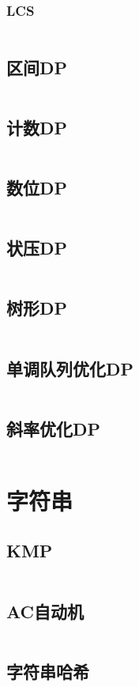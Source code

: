 \documentclass[a4paper,12pt]{article}
\begin{document}
\subsubsection{LCS}
\inputminted[breaklines, linenos]{c++}{dp/linear/lcs.cc}
\subsection{区间DP}
\inputminted[breaklines, linenos]{c++}{dp/interval.cc}
\subsection{计数DP}
\inputminted[breaklines, linenos]{c++}{dp/jishu.cc}
\subsection{数位DP}
\inputminted[breaklines, linenos]{c++}{dp/shuwei.cc}
\subsection{状压DP}
\inputminted[breaklines, linenos]{c++}{dp/zhuangya.cc}
\subsection{树形DP}
\inputminted[breaklines, linenos]{c++}{dp/treedp.cc}
\subsection{单调队列优化DP}
\inputminted[breaklines, linenos]{c++}{dp/dddl.cc}
\subsection{斜率优化DP}
\inputminted[breaklines, linenos]{c++}{dp/xielv.cc}


\newpage
\section{字符串}
\subsection{KMP}
\inputminted[breaklines, linenos]{c++}{string/kmp.cc}
\subsection{AC自动机}
\inputminted[breaklines, linenos]{c++}{string/ac_auto.cc}
\subsection{字符串哈希}
\inputminted[breaklines, linenos]{c++}{string/hash.cc}
\end{document}
